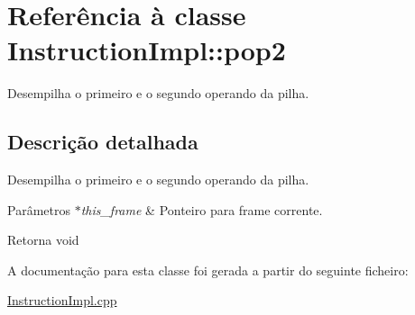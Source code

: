 \hypertarget{class_instruction_impl_1_1pop2}{}\section{Referência à classe Instruction\+Impl\+:\+:pop2}
\label{class_instruction_impl_1_1pop2}


Desempilha o primeiro e o segundo operando da pilha.  




\subsection{Descrição detalhada}
Desempilha o primeiro e o segundo operando da pilha. 


\begin{DoxyParams}{Parâmetros}
{\em $\ast$this\+\_\+frame} & Ponteiro para frame corrente. \\
\hline
\end{DoxyParams}
\begin{DoxyReturn}{Retorna}
void 
\end{DoxyReturn}


A documentação para esta classe foi gerada a partir do seguinte ficheiro\+:\begin{DoxyCompactItemize}
\item 
\hyperlink{_instruction_impl_8cpp}{Instruction\+Impl.\+cpp}\end{DoxyCompactItemize}
